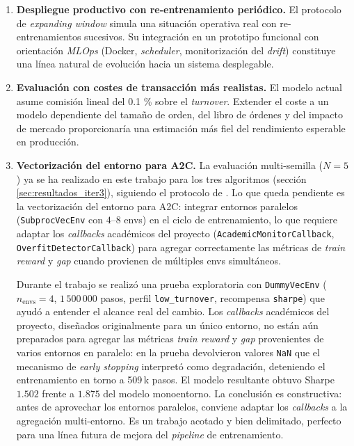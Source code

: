 \documentclass[IB,a4paper]{TFUOC}
\begin{document}
\begin{enumerate}
    \item \textbf{Despliegue productivo con re-entrenamiento periódico.} El protocolo de \textit{expanding window} simula una situación operativa real con re-entrenamientos sucesivos. Su integración en un prototipo funcional con orientación \textit{MLOps} (Docker, \textit{scheduler}, monitorización del \textit{drift}) constituye una línea natural de evolución hacia un sistema desplegable.

    \item \textbf{Evaluación con costes de transacción más realistas.} El modelo actual asume comisión lineal del 0.1 \% sobre el \textit{turnover}. Extender el coste a un modelo dependiente del tamaño de orden, del libro de órdenes y del impacto de mercado proporcionaría una estimación más fiel del rendimiento esperable en producción.

    \item \textbf{Vectorización del entorno para A2C.} La evaluación multi-semilla ($N=5$) ya se ha realizado en este trabajo para los tres algoritmos (sección \ref{sec:resultados_iter3}), siguiendo el protocolo de \citet{henderson2018deeprl}. Lo que queda pendiente es la vectorización del entorno para A2C: integrar entornos paralelos (\texttt{SubprocVecEnv} con $4$--$8$ envs) en el ciclo de entrenamiento, lo que requiere adaptar los \textit{callbacks} académicos del proyecto (\texttt{AcademicMonitorCallback}, \texttt{OverfitDetectorCallback}) para agregar correctamente las métricas de \textit{train reward} y \textit{gap} cuando provienen de múltiples envs simultáneos.

    Durante el trabajo se realizó una prueba exploratoria con \texttt{DummyVecEnv} ($n_{\mathrm{envs}}=4$, $1\,500\,000$ pasos, perfil \texttt{low\_turnover}, recompensa \texttt{sharpe}) que ayudó a entender el alcance real del cambio. Los \textit{callbacks} académicos del proyecto, diseñados originalmente para un único entorno, no están aún preparados para agregar las métricas \textit{train reward} y \textit{gap} provenientes de varios entornos en paralelo: en la prueba devolvieron valores \texttt{NaN} que el mecanismo de \textit{early stopping} interpretó como degradación, deteniendo el entrenamiento en torno a 509\,k pasos. El modelo resultante obtuvo Sharpe $1.502$ frente a $1.875$ del modelo monoentorno. La conclusión es constructiva: antes de aprovechar los entornos paralelos, conviene adaptar los \textit{callbacks} a la agregación multi-entorno. Es un trabajo acotado y bien delimitado, perfecto para una línea futura de mejora del \textit{pipeline} de entrenamiento.
\end{enumerate}
\end{document}
